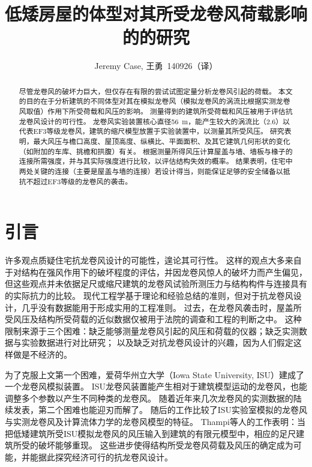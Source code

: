 \documentclass{ctexart}
\title{低矮房屋的体型对其所受龙卷风荷载影响的的研究}
\author{Jeremy Case, 王勇~140926（译）}
\date{}
\begin{document}
\maketitle

\begin{abstract}
尽管龙卷风的破坏力巨大，但仅存在有限的尝试试图定量分析龙卷风引起的荷载。
本文的目的在于分析建筑的不同体型对其在模拟龙卷风（模拟龙卷风的涡流比根据实测龙卷风取值）作用下所受荷载和风压的影响。
测量得到的建筑所受荷载和风压被用于评估抗龙卷风设计的可行性。
龙卷风实验装置核心直径\SI{56}{m}，能产生较大的涡流比（\num{2.6}）以代表EF3等级龙卷风，建筑的缩尺模型放置于实验装置中，以测量其所受风压。
研究表明，最大风压与檐口高度、屋顶高度、纵横比、平面面积、及其它建筑几何形状的变化（如附加的车库、挑檐和拱腹）有关。
根据测量所得风压计算屋盖与墙、墙板与椽子的连接所需强度，并与其实际强度进行比较，以评估结构失效的概率。
结果表明，住宅中两处关键的连接（主要是屋盖与墙的连接）若设计得当，则能保证足够的安全储备以抵抗不超过EF3等级的龙卷风的袭击。
\end{abstract}

\section{引言}
许多观点质疑住宅抗龙卷风设计的可能性，遑论其可行性。
这样的观点大多来自于对结构在强风作用下的破坏程度的评估，并因龙卷风惊人的破坏力而产生偏见，
但这些观点并未依据足尺或缩尺建筑的龙卷风试验所测压力与结构构件与连接具有的实际抗力的比较。
现代工程学基于理论和经验总结的准则，但对于抗龙卷风设计，几乎没有数据能用于形成实用的工程准则。
过去，在龙卷风袭击时，屋盖所受风压及结构所受荷载的近似数据仅被用于法院的调查和工程的判断之中。
这种限制来源于三个困难：缺乏能够测量龙卷风引起的风压和荷载的仪器；缺乏实测数据与实验数据进行对比研究；
以及缺乏对抗龙卷风设计的兴趣，因为人们假定这样做是不经济的。

为了克服上文第一个困难\cite{haan2008design}，爱荷华州立大学（Iowa State University, ISU）建成了一个龙卷风模拟装置。
ISU龙卷风装置能产生相对于建筑模型运动的龙卷风，也能调整多个参数以产生不同种类的龙卷风。
随着近年来几次龙卷风的实测数据的陆续发表\cite{karstens2010near}\cite{lee2005diagnosed}\cite{wurman2002multiple}，第二个困难也能迎刃而解了。
随后的工作比较了ISU实验室模拟的龙卷风与实测龙卷风及计算流体力学的龙卷风模型的特征\cite{sarkar2005laboratory}。
Thampi等人的工作\cite{thampi2011finite}表明：当把低矮建筑所受ISU模拟龙卷风的风压输入到建筑的有限元模型中，相应的足尺建筑所受的破坏能够重现。
这些进步使得结构所受龙卷风荷载及风压的确定成为可能，并能据此探究经济可行的抗龙卷风设计。
\end{document}
